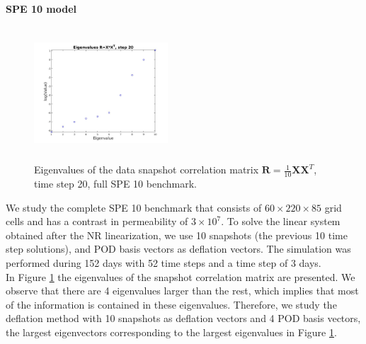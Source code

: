 \documentclass[review]{elsarticle}
\begin{document}
\newpage
\textbf{SPE 10 model}\\
\begin{figure}
\centering 
\vspace{-10pt}
\includegraphics[width=5cm,height=5cm,keepaspectratio]{images/eig_pod2085.jpg}
\caption{Eigenvalues of the data snapshot correlation matrix $\mathbf{R}=\frac{1}{10}\mathbf{X}\mathbf{X}^T$, time step 20, full SPE 10 benchmark.}
\label{fig:eig_POD_SPE85}
\vspace{-5pt}
\end{figure}

We study the complete SPE 10 benchmark that consists of $60\times220\times85$ grid cells and has a contrast in permeability of $3\times 10^{7}$. To solve the linear system obtained after the NR linearization, we use 10 snapshots (the previous 10 time step solutions), and POD basis vectors as deflation vectors. The simulation was performed during 152 days with 52 time steps and a time step of 3 days.\\
In Figure \ref{fig:eig_POD_SPE85} the eigenvalues of the snapshot correlation matrix are presented. We observe that there are 4 eigenvalues larger than the rest, which implies that most of the information is contained in these eigenvalues. Therefore, we study the deflation method with 10 snapshots as deflation vectors and 4 POD basis vectors, the largest eigenvectors corresponding to the largest eigenvalues in Figure \ref{fig:eig_POD_SPE85}. \\
\end{document}
